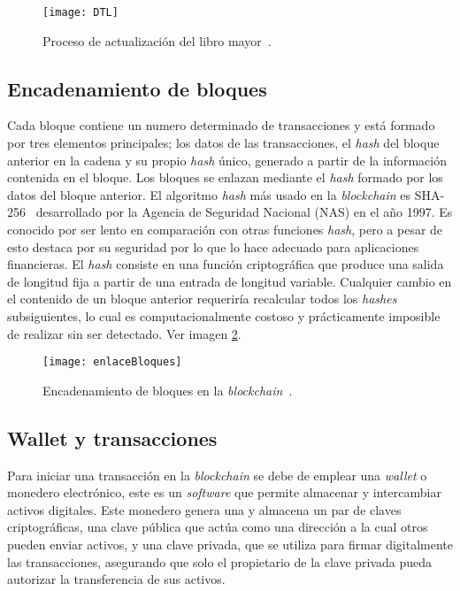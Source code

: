\begin{figure}[h]
	\centering
	\texttt{[image: DTL]}
	\caption[Libro mayor digital]{Proceso de actualización del libro mayor~\cite{BlockchainFuncionamiento}.}
	\label{fig:DTL}
\end{figure}

\subsection{Encadenamiento de bloques}

Cada bloque contiene un numero determinado de transacciones y está formado por tres elementos principales; los datos de las transacciones, el \textit{hash} del bloque anterior en la cadena  y su propio \textit{hash} único, generado a partir de la información contenida en el bloque.
Los bloques se enlazan mediante el \textit{hash} formado por los datos del bloque anterior.
El algoritmo \textit{hash} más usado en la \textit{blockchain} es SHA-256~\cite{sha256} desarrollado por la Agencia de Seguridad Nacional (NAS) en el año 1997. Es conocido por ser lento en comparación con otras funciones \textit{hash}, pero a pesar de esto destaca por su seguridad por lo que lo hace adecuado para aplicaciones financieras.
El \textit{hash} consiste en una función criptográfica que produce una salida de longitud fija a partir de una entrada de longitud variable. Cualquier cambio en el contenido de un bloque anterior requeriría recalcular todos los \textit{hashes} subsiguientes, lo cual es computacionalmente costoso y prácticamente imposible de realizar sin ser detectado.
Ver imagen \ref{fig:enlaceBloques}.

\begin{figure}[h]
	\centering
	\texttt{[image: enlaceBloques]}
	\caption[Encadenamiento bloques blockchain]{Encadenamiento de bloques en la \textit{blockchain}~\cite{BlockchainFuncionamiento}.}
	\label{fig:enlaceBloques}
\end{figure}

\subsection{Wallet y transacciones}

Para iniciar una transacción en la \textit{blockchain} se debe de emplear una \textit{wallet} o monedero electrónico, este es un \textit{software} que permite almacenar y intercambiar activos digitales.
Este monedero genera una y almacena un par de claves criptográficas, una clave pública que actúa como una dirección a la cual otros pueden enviar activos, y una clave privada, que se utiliza para firmar digitalmente las transacciones, asegurando que solo el propietario de la clave privada pueda autorizar la transferencia de sus activos.

